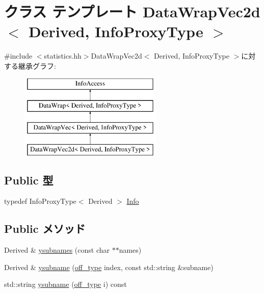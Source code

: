 \hypertarget{classStats_1_1DataWrapVec2d}{
\section{クラス テンプレート DataWrapVec2d$<$ Derived, InfoProxyType $>$}
\label{classStats_1_1DataWrapVec2d}
}


{\ttfamily \#include $<$statistics.hh$>$}DataWrapVec2d$<$ Derived, InfoProxyType $>$に対する継承グラフ:\begin{figure}[H]
\begin{center}
\leavevmode
\includegraphics[height=4cm]{classStats_1_1DataWrapVec2d}
\end{center}
\end{figure}
\subsection*{Public 型}
\begin{DoxyCompactItemize}
\item 
typedef InfoProxyType$<$ Derived $>$ \hyperlink{classStats_1_1DataWrapVec2d_a76d2c248839f34168d2a3760bc1fbdb9}{Info}
\end{DoxyCompactItemize}
\subsection*{Public メソッド}
\begin{DoxyCompactItemize}
\item 
Derived \& \hyperlink{classStats_1_1DataWrapVec2d_af87b1ae68d8479e89e6c66bbd2e0936c}{ysubnames} (const char $\ast$$\ast$names)
\item 
Derived \& \hyperlink{classStats_1_1DataWrapVec2d_ac3f960761325c75597115739290c014f}{ysubname} (\hyperlink{namespaceStats_a2773c9fa9e4b0b04a46b37494b44842a}{off\_\-type} index, const std::string \&subname)
\item 
std::string \hyperlink{classStats_1_1DataWrapVec2d_a24e4f0faf052ff85a565d2b1e443a494}{ysubname} (\hyperlink{namespaceStats_a2773c9fa9e4b0b04a46b37494b44842a}{off\_\-type} i) const 
\end{DoxyCompactItemize}
